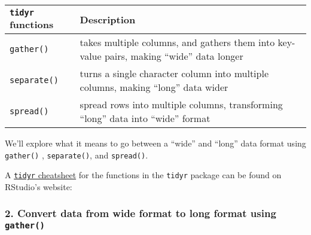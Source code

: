 \documentclass[]{article}
\begin{document}
\begin{longtable}[]{@{}ll@{}}
\toprule
\begin{minipage}[b]{0.03\columnwidth}\raggedright
\texttt{tidyr} functions\strut
\end{minipage} & \begin{minipage}[b]{0.91\columnwidth}\raggedright
Description\strut
\end{minipage}\tabularnewline
\midrule
\endhead
\begin{minipage}[t]{0.03\columnwidth}\raggedright
\texttt{gather()}\strut
\end{minipage} & \begin{minipage}[t]{0.91\columnwidth}\raggedright
takes multiple columns, and gathers them into key-value pairs, making
``wide'' data longer\strut
\end{minipage}\tabularnewline
\begin{minipage}[t]{0.03\columnwidth}\raggedright
\texttt{separate()}\strut
\end{minipage} & \begin{minipage}[t]{0.91\columnwidth}\raggedright
turns a single character column into multiple columns, making ``long''
data wider\strut
\end{minipage}\tabularnewline
\begin{minipage}[t]{0.03\columnwidth}\raggedright
\texttt{spread()}\strut
\end{minipage} & \begin{minipage}[t]{0.91\columnwidth}\raggedright
spread rows into multiple columns, transforming ``long'' data into
``wide'' format\strut
\end{minipage}\tabularnewline
\bottomrule
\end{longtable}

We'll explore what it means to go between a ``wide'' and ``long'' data
format using \texttt{gather()} , \texttt{separate()}, and
\texttt{spread()}.

A
\href{https://www.rstudio.com/wp-content/uploads/2015/02/data-wrangling-cheatsheet.pdf}{\texttt{tidyr}
cheatsheet} for the functions in the \texttt{tidyr} package can be found
on RStudio's website:

\hypertarget{convert-data-from-wide-format-to-long-format-using-gather}{%
\subsubsection{\texorpdfstring{2. Convert data from wide format to long
format using
\texttt{gather()}}{2. Convert data from wide format to long format using gather()}}\label{convert-data-from-wide-format-to-long-format-using-gather}}
\end{document}

